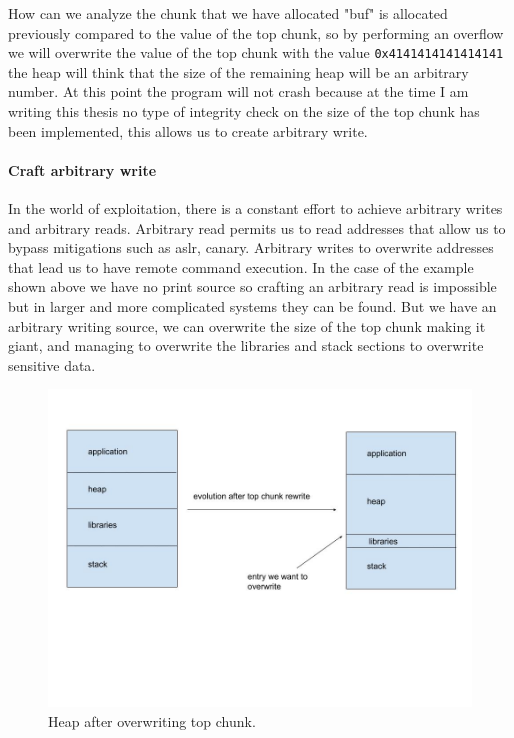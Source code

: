     How can we analyze the chunk that we have allocated "buf" is allocated previously compared to the value of the top chunk, so by performing an overflow we will overwrite the value of the top chunk with the value \texttt{0x4141414141414141}
    the heap will think that the size of the remaining heap will be an arbitrary number.\newline
    At this point the program will not crash because at the time I am writing this thesis no type of integrity check on the size of the top chunk has been implemented, this allows us to create arbitrary write.
    \clearpage
    \paragraph{Craft arbitrary write}
    In the world of exploitation, there is a constant effort to achieve arbitrary writes and arbitrary reads.\newline
    Arbitrary read permits us to read addresses that allow us to bypass mitigations such as aslr, canary. \newline
    Arbitrary writes to overwrite addresses that lead us to have remote command execution.
    In the case of the example shown above we have no print source so crafting an arbitrary read is impossible but in larger and more complicated systems they can be found. \newline
    But we have an arbitrary writing source, we can overwrite the size of the top chunk making it giant, and managing to overwrite the libraries and stack sections to overwrite sensitive data.
    \begin{figure}[htbp]
        \centering
        \includegraphics[width=1\linewidth]{Images/heap_trasformation.jpg}
        \caption{Heap after overwriting top chunk.}
        \label{fig:enter-label}
    \end{figure}
    \clearpage
